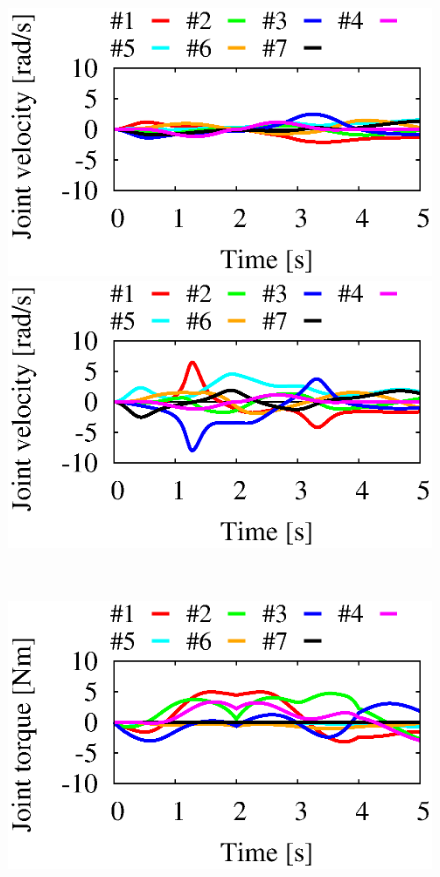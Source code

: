 \begin{figure}[t]
  \centering
  \begin{minipage}[h]{0.40\linewidth}
    \centering
    \includegraphics[width=1.0\linewidth]{fig/chapter6/results/spatial/RNS/RNS_X03_Joint_velocity.eps}
  \end{minipage}
  \begin{minipage}[h]{0.40\linewidth}
    \centering
        \includegraphics[width=1.0\linewidth]{fig/chapter6/results/spatial/OSF/OSF_X03_Joint_velocity.eps}
  \end{minipage}\\
  \vspace{-2mm}
  \begin{minipage}[h]{0.40\linewidth}
    \centering
    \includegraphics[width=1.0\linewidth]{fig/chapter6/results/spatial/RNS/RNS_U01_joint_torque_1-4.eps}

\end{minipage}
\end{figure}
